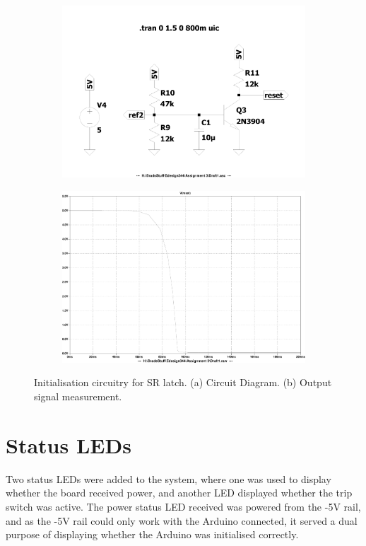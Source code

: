\begin{figure}[ht]
 \footnotesize
 \centering
    \begin{subfigure}[]{0.45\textwidth}
              \centering
  		\includegraphics[width=1.0\linewidth]{./Figures/reset_init_schem.pdf}
		    \caption{} \label{subfig:switch_init_schem}
     \end{subfigure}
     \begin{subfigure}[]{0.45\textwidth}
             \centering
  		\includegraphics[width=1.0\linewidth]{./Figures/reset_init_output.pdf}
		   \caption{ } \label{subfig:switch_init_meas}
     \end{subfigure}
     \caption[Initialisation circuitry for the SR latch.]{Initialisation circuitry for SR latch. (a) Circuit Diagram. (b) Output signal measurement. } \label{fig:switch_extra_results}
\end{figure}

\section{Status LEDs} 
Two status LEDs were added to the system, where one was used to display whether the board received power, and another LED displayed whether the trip switch was active. The power status LED received was powered from the -5V rail, and as the -5V rail could only work with the Arduino connected, it served a dual purpose of displaying whether the Arduino was initialised correctly.